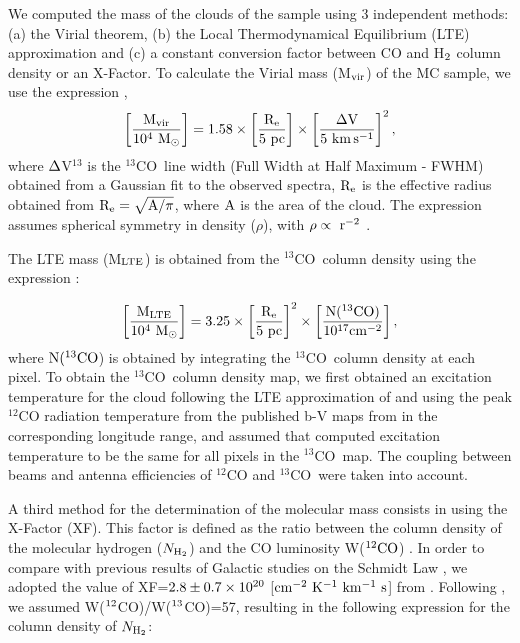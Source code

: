 \documentclass[iop]{emulateapj}
\newcommand{\co}{$^{13}$CO}
\newcommand{\nhtwo}{$N_{{\rm H}_2}$}
\begin{document}
We computed the mass of the clouds of the sample using 3 independent 
methods: (a) the Virial theorem, (b) the Local Thermodynamical Equilibrium 
(LTE) approximation and (c) a constant conversion factor between CO and 
H$\rm_{2}$ column density or an X-Factor. To calculate the Virial mass 
(M$\rm_{\rm vir}$) of the MC sample, we use the expression \citep{may+97},
%
\begin{equation}
\rm
\left[ \frac{M_{\rm vir}}{10^4~M_{\odot}} \right]= 1.58\times \left[ \frac{R_e}{5~pc} \right] \times
\left[ \frac{\Delta V}{5~km\,s^{-1}} \right]^{2},
\end{equation}
%
where $\rm\Delta$V$^{13}$ is the \co\ line width (Full Width at Half 
Maximum - FWHM) obtained from a Gaussian fit to the observed spectra, 
$\rm R_{e}$ is the effective radius obtained from 
$\rm R_{e}=\sqrt{A/\pi}$, where $\rm A$ is the area of the cloud. 
The expression assumes spherical symmetry in density ($\rho$), with 
$\rm \rho\propto~r^{-2}$ \citep{maclaren+88}.

The LTE mass (M$\rm_{LTE}$) is obtained from 
the \co\ column density using the expression \citep{simon+01}:

\begin{equation}
\rm
\left[ \frac{M_{\rm LTE}}{10^4~M_{\odot}} \right] = 3.25\times \left[ \frac{R_e}{5~pc} \right]^2 
\times  \left[ \frac{N(^{13}CO)}{10^{17}cm^{-2}}\right],
\end{equation}
%
where $\rm N(^{13}CO$) is obtained by integrating the \co\ column density at
each pixel. 
To obtain the \co\ column density map, we first obtained an excitation temperature 
for the cloud following the LTE approximation of \citet{dickman78} and using 
the peak $^{12}$CO radiation temperature from the published b-V maps from 
\citet{sanders+86} in the corresponding longitude range, and assumed that 
computed excitation temperature to be the same for all pixels in the \co\ map. 
The coupling between beams and antenna efficiencies of $^{12}$CO and \co\ 
were taken into account.

A third method for the determination of the molecular mass consists in 
using the X-Factor (XF). This factor is defined as the
ratio between the column density of the molecular hydrogen (\nhtwo)  
and the CO luminosity W(${\rm ^{12}CO}$) 
\citep[${\rm XF}\equiv {N(\rm H_2)}/{W({\rm ^{12}CO});}$][]{pineda+08}.
In order to compare with previous results of Galactic studies on 
the Schmidt Law \citep{heiderman+10}, we adopted the value of  
XF=${\rm 2.8\pm0.7\times10^{20}}$ [$\rm cm^{-2}~K^{-1}~km^{-1}~s$] from 
\citep{bloemen+86}. Following \citet{goto+03}, we assumed 
W($\rm^{12}$CO)/W($\rm^{13}$CO)=57, resulting in the following expression for
the column density of \nhtwo:
\end{document}
